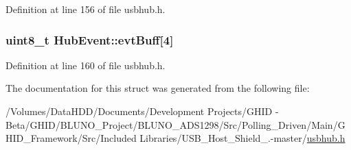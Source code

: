 \-Definition at line 156 of file usbhub.\-h.

\hypertarget{struct_hub_event_a5a8016b368bc8ac993abae3f97b8306f}{
\subsubsection[{evt\-Buff}]{\setlength{\rightskip}{0pt plus 5cm}uint8\-\_\-t {\bf \-Hub\-Event\-::evt\-Buff}\mbox{[}4\mbox{]}}}\label{struct_hub_event_a5a8016b368bc8ac993abae3f97b8306f}


\-Definition at line 160 of file usbhub.\-h.



\-The documentation for this struct was generated from the following file\-:\begin{DoxyCompactItemize}
\item 
/\-Volumes/\-Data\-H\-D\-D/\-Documents/\-Development Projects/\-G\-H\-I\-D -\/ Beta/\-G\-H\-I\-D/\-B\-L\-U\-N\-O\-\_\-\-Project/\-B\-L\-U\-N\-O\-\_\-\-A\-D\-S1298/\-Src/\-Polling\-\_\-\-Driven/\-Main/\-G\-H\-I\-D\-\_\-\-Framework/\-Src/\-Included Libraries/\-U\-S\-B\-\_\-\-Host\-\_\-\-Shield\-\_.-\/master/\hyperlink{usbhub_8h}{usbhub.\-h}\end{DoxyCompactItemize}
